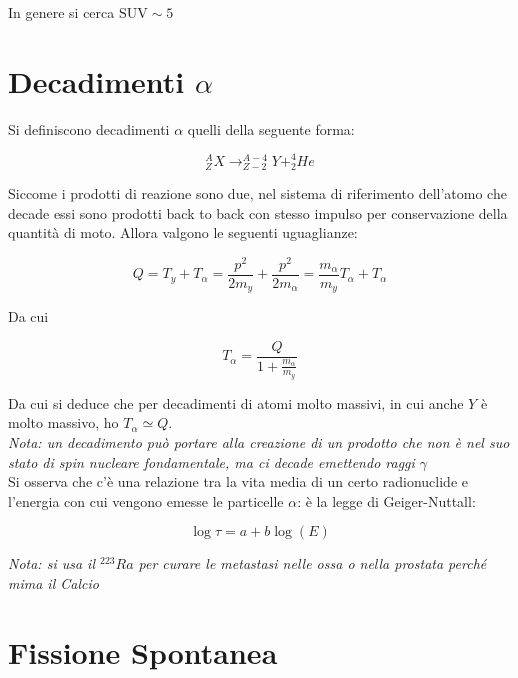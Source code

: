 In genere si cerca $\text{SUV}\sim5$

\section{Decadimenti $\alpha$}

Si definiscono decadimenti $\alpha$ quelli della seguente forma:

\begin{equation}
^A_Z X \longrightarrow ^{A-4}_{Z-2}Y + ^4_2He
\end{equation}

Siccome i prodotti di reazione sono due, nel sistema di riferimento dell'atomo che decade essi sono prodotti back to back con stesso impulso per conservazione della quantità di moto. Allora valgono le seguenti uguaglianze:

\begin{equation}
Q=T_y+T_{\alpha}=\frac{p^2}{2m_y}+\frac{p^2}{2m_{\alpha}}=\frac{m_{\alpha}}{m_y}T_{\alpha}+T_{\alpha}
\end{equation}

Da cui

\begin{equation}
T_{\alpha}=\frac{Q}{1+\frac{m_{\alpha}}{m_y}} 
\end{equation}

Da cui si deduce che per decadimenti di atomi molto massivi, in cui anche $Y$ è molto massivo, ho $T_{\alpha}\simeq Q$.\\

\emph{Nota: un decadimento può portare alla creazione di un prodotto che non è nel suo stato di spin nucleare fondamentale, ma ci decade emettendo raggi $\gamma$ }\\

Si osserva che c'è una relazione tra la vita media di un certo radionuclide e l'energia con cui vengono emesse le particelle $\alpha$: è la legge di Geiger-Nuttall:

\begin{equation}
\log \tau = a + b \log (E)
\end{equation}

\emph{Nota: si usa il $^{223}Ra$ per curare le metastasi nelle ossa o nella prostata perché mima il Calcio}

\section{Fissione Spontanea}


